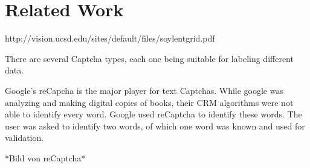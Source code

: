 \section{Related Work}
\label{sec:related_work}

http://vision.ucsd.edu/sites/default/files/soylentgrid.pdf

There are several Captcha types, each one being suitable for labeling different data.

Google's reCapcha is the major player for text Captchas. While google was analyzing  and making digital copies of books, their CRM algorithms were not able to identify every word. Google used reCaptcha to identify these words. The user was asked to identify two words, of which one word was known and used for validation.

*Bild von reCaptcha*

	\clearpage